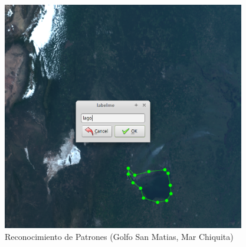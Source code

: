 \begin{figure}[H]
 \centering
  \includegraphics[height=10cm,keepaspectratio=true,clip=true]{imagenes/Logos/labelme2.png}
  \caption{Reconocimiento de Patrones (Golfo San Matias, Mar Chiquita)}
	\label{Fig: reconocimientopatrones}
\end{figure}



